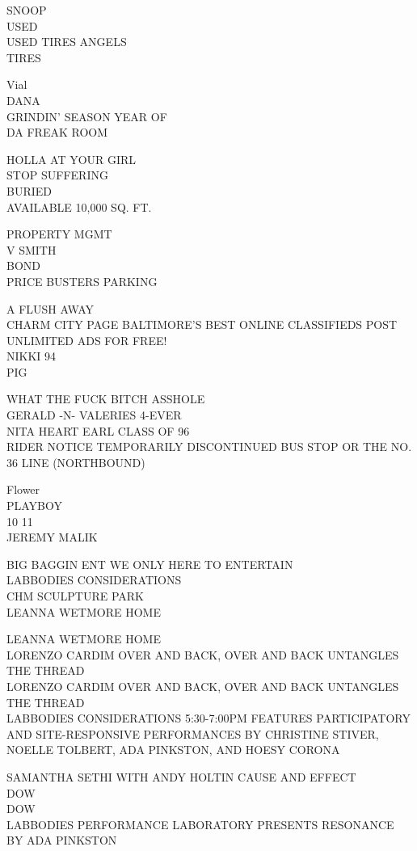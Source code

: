 \documentclass[10pt,letterpaper]{article}
\begin{document}
SNOOP\\
USED\\
USED TIRES ANGELS\\
TIRES

Vial\\
DANA\\
GRINDIN' SEASON YEAR OF\\
DA FREAK ROOM

HOLLA AT YOUR GIRL\\
STOP SUFFERING\\
BURIED\\
AVAILABLE 10,000 SQ. FT.

PROPERTY MGMT\\
V SMITH\\
BOND\\
PRICE BUSTERS PARKING

A FLUSH AWAY\\
CHARM CITY PAGE BALTIMORE'S BEST ONLINE CLASSIFIEDS POST UNLIMITED ADS FOR FREE!\\
NIKKI 94\\
PIG

WHAT THE FUCK BITCH ASSHOLE\\
GERALD {-}N{-} VALERIES 4{-}EVER\\
NITA HEART EARL CLASS OF 96\\
RIDER NOTICE TEMPORARILY DISCONTINUED BUS STOP OR THE NO. 36 LINE (NORTHBOUND)

Flower\\
PLAYBOY\\
10 11\\
JEREMY MALIK

BIG BAGGIN ENT WE ONLY HERE TO ENTERTAIN\\
LABBODIES CONSIDERATIONS\\
CHM SCULPTURE PARK\\
LEANNA WETMORE HOME

LEANNA WETMORE HOME\\
LORENZO CARDIM OVER AND BACK, OVER AND BACK UNTANGLES THE THREAD\\
LORENZO CARDIM OVER AND BACK, OVER AND BACK UNTANGLES THE THREAD\\
LABBODIES CONSIDERATIONS 5:30{-}7:00PM FEATURES PARTICIPATORY AND SITE{-}RESPONSIVE PERFORMANCES BY CHRISTINE STIVER, NOELLE TOLBERT, ADA PINKSTON, AND HOESY CORONA

SAMANTHA SETHI WITH ANDY HOLTIN CAUSE AND EFFECT\\
DOW\\
DOW\\
LABBODIES PERFORMANCE LABORATORY PRESENTS RESONANCE BY ADA PINKSTON
\end{document}
